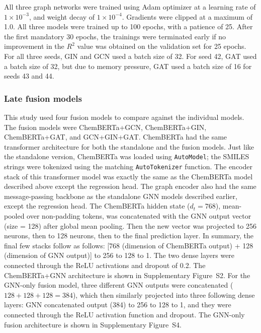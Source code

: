 \documentclass[11pt,a4paper]{article}
\begin{document}
All three graph networks were trained using Adam optimizer at a learning rate of $1\times 10^{-3}$, and weight decay of $1\times 10^{-4}$.
Gradients were clipped at a maximum of 1.0.
All three models were trained up to 100 epochs, with a patience of 25.
After the first mandatory 30 epochs, the trainings were terminated early if no improvement in the $R^{2}$ value was obtained on the validation set for 25 epochs.
For all three seeds, GIN and GCN used a batch size of 32.
For seed 42, GAT used a batch size of 32, but due to memory pressure, GAT used a batch size of 16 for seeds 43 and 44.

\subsubsection{Late fusion models}
This study used four fusion models to compare against the individual models.
The fusion models were ChemBERTa+GCN, ChemBERTa+GIN, ChemBERTa+GAT, and GCN+GIN+GAT.
ChemBERTa had the same transformer architecture for both the standalone and the fusion models.
Just like the standalone version, ChemBERTa was loaded using \texttt{AutoModel}; the SMILES strings were tokenized using the matching \texttt{AutoTokenizer} function.
The encoder stack of this transformer model was exactly the same as the ChemBERTa model described above except the regression head.
The graph encoder also had the same message-passing backbone as the standalone GNN models described earlier, except the regression head.
The ChemBERTa hidden state ($d_t = 768$), mean-pooled over non-padding tokens, was concatenated with the GNN output vector (size = 128) after global mean pooling.
Then the new vector was projected to 256 neurons, then to 128 neurons, then to the final prediction layer.
In summary, the final few stacks follow as follows: [768 (dimension of ChemBERTa output) + 128 (dimension of GNN output)] to 256 to 128 to 1.
The two dense layers were connected through the ReLU activations and dropout of 0.2.
The ChemBERTa+GNN architecture is shown in Supplementary Figure~S2.
For the GNN-only fusion model, three different GNN outputs were concatenated ($128+128+128=384$), which then similarly projected into three following dense layers: GNN concatenated output (384) to 256 to 128 to 1, and they were connected through the ReLU activation function and dropout.
The GNN-only fusion architecture is shown in Supplementary Figure~S4.
\end{document}
